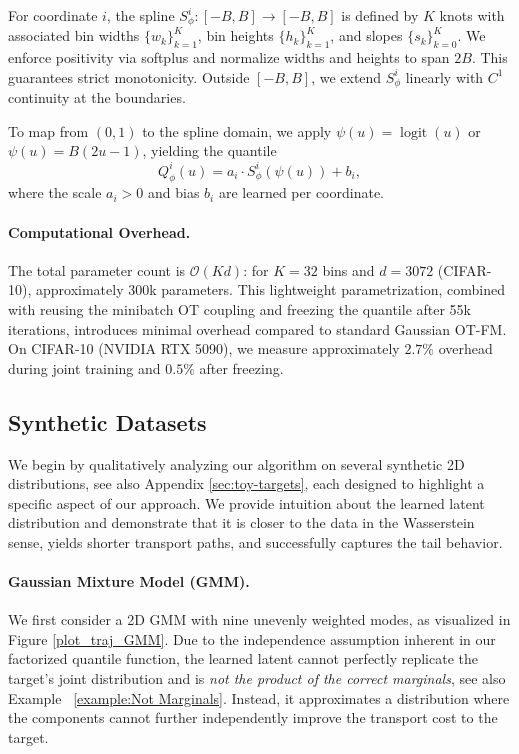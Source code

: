 \documentclass{article}
\theoremstyle{plain}
\theoremstyle{definition}
\theoremstyle{remark}
\begin{document}
For coordinate $i$, the spline $S^i_\phi: [-B, B] \to [-B, B]$ is defined 
by $K$ knots with associated bin widths $\{w_k\}_{k=1}^K$, bin heights 
$\{h_k\}_{k=1}^K$, and slopes $\{s_k\}_{k=0}^K$. We enforce positivity 
via softplus and normalize widths and heights to span $2B$. This 
guarantees strict monotonicity. Outside $[-B, B]$, we extend $S^i_\phi$ 
linearly with $C^1$ continuity at the boundaries.

To map from $(0,1)$ to the spline domain, we apply $\psi(u) = 
\operatorname{logit}(u)$ or $\psi(u) = B(2u - 1)$, yielding the quantile
\begin{equation}
    Q^i_\phi(u) = a_i \cdot S^i_\phi(\psi(u)) + b_i,
\end{equation}
where the scale $a_i > 0$ and bias $b_i$ are learned per coordinate.

\paragraph{Computational Overhead.} The total parameter count is $\mathcal{O}(Kd)$: for $K = 32$ bins and $d = 3072$ (CIFAR-10), approximately 300k parameters. 
This lightweight parametrization, combined with reusing the minibatch OT coupling and freezing the quantile after 55k iterations, introduces minimal overhead compared to standard Gaussian OT-FM. On CIFAR-10 (NVIDIA RTX 5090), we measure approximately $2.7\%$ overhead during joint training and $0.5\%$ after freezing.

%
\subsection{Synthetic Datasets}\label{subsec:exp Synthetic Datasets}
We begin by qualitatively analyzing our algorithm on several synthetic 2D distributions, see also Appendix \ref{sec:toy-targets}, each designed to highlight a specific aspect of our approach. We provide intuition about the learned latent distribution and demonstrate that it is closer to the data in the Wasserstein sense, yields shorter transport paths, and successfully captures the tail behavior.
%
\paragraph{Gaussian Mixture Model (GMM).}
We first consider a 2D GMM with nine unevenly weighted modes, as visualized in Figure \ref{plot_traj_GMM}. Due to the independence assumption inherent in our factorized quantile function, the learned latent cannot perfectly replicate the target's joint distribution and is \emph{not the product of the correct marginals}, see also Example ~\ref{example:Not Marginals}. Instead, it approximates a distribution where the components cannot further independently improve the transport cost to the target. 
%
\end{document}
